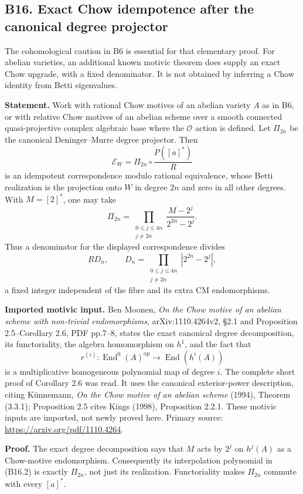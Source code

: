 \documentclass[11pt,a4paper]{article}
\theoremstyle{definition}
\begin{document}
\subsection{B16. Exact Chow idempotence after the canonical degree projector}\label{b16.-exact-chow-idempotence-after-the-canonical-degree-projector}

The cohomological caution in B6 is essential for that elementary proof. For abelian varieties, an additional known motivic theorem does supply an exact Chow upgrade, with a fixed denominator. It is not obtained by inferring a Chow identity from Betti eigenvalues.

\textbf{Statement.} Work with rational Chow motives of an abelian variety \(A\) as in B6, or with relative Chow motives of an abelian scheme over a smooth connected quasi-projective complex algebraic base where the \(\mathcal O\) action is defined. Let \(\Pi_{2n}\) be the canonical Deninger--Murre degree projector. Then \[
 \mathcal E_W=\Pi_{2n}\circ\frac{P([a]^*)}{R}
\tag{B16.1}
\] is an idempotent correspondence modulo rational equivalence, whose Betti realization is the projection onto \(W\) in degree \(2n\) and zero in all other degrees. With \(M=[2]^*\), one may take \[
 \Pi_{2n}=\prod_{\substack{0\le j\le4n\\j\ne2n}}
              \frac{M-2^j}{2^{2n}-2^j}.
\tag{B16.2}
\] Thus a denominator for the displayed correspondence divides \[
 R D_n,\qquad
 D_n=\prod_{\substack{0\le j\le4n\\j\ne2n}}|2^{2n}-2^j|,
\] a fixed integer independent of the fibre and its extra CM endomorphisms.

\textbf{Imported motivic input.} Ben Moonen, \emph{On the Chow motive of an abelian scheme with non-trivial endomorphisms}, arXiv:1110.4264v2, §2.1 and Proposition 2.5--Corollary 2.6, PDF pp.7--8, states the exact canonical degree decomposition, its functoriality, the algebra homomorphism on \(h^1\), and the fact that \[
 r^{(i)}:\operatorname{End}^0(A)^{\mathrm{op}}
       \longrightarrow\operatorname{End}(h^i(A))
\] is a multiplicative homogeneous polynomial map of degree \(i\). The complete short proof of Corollary 2.6 was read. It uses the canonical exterior-power description, citing Künnemann, \emph{On the Chow motive of an abelian scheme} (1994), Theorem (3.3.1); Proposition 2.5 cites Kings (1998), Proposition 2.2.1. These motivic inputs are imported, not newly proved here. Primary source: \url{https://arxiv.org/pdf/1110.4264}.

\textbf{Proof.} The exact degree decomposition says that \(M\) acts by \(2^j\) on \(h^j(A)\) as a Chow-motive endomorphism. Consequently its interpolation polynomial in (B16.2) is exactly \(\Pi_{2n}\), not just its realization. Functoriality makes \(\Pi_{2n}\) commute with every \([a]^*\).
\end{document}
